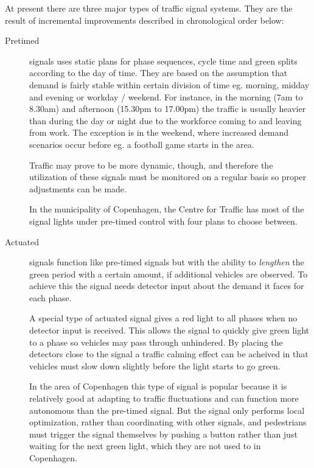 \label{signal_types}

At present there are three major types of traffic signal systems. They are the result of incremental improvements described in chronological order below:

\begin{description}
\item[Pretimed] signals uses static plans for phase sequences, cycle time and green splits according to the day of time. 
\label{pretimed}
They are based on the assumption that demand is fairly stable within certain division of time eg. morning, midday and evening or workday / weekend. For instance, in the morning (7am to 8.30am) and afternoon (15.30pm to 17.00pm) the traffic is usually heavier than during the day or night due to the workforce coming to and leaving from work. The exception is in the weekend, where increased demand scenarios occur before eg. a football game starts in the area.

Traffic may prove to be more dynamic, though, and therefore the utilization of these signals must be monitored on a regular basis so proper adjustments can be made.

In the municipality of Copenhagen, the Centre for Traffic has most of the signal lights under pre-timed control with four plans to choose between.
\item[Actuated] signals function like pre-timed signals but with the ability to \textit{lengthen} the green period with a certain amount, if additional vehicles are observed. 
\label{actuated}
To achieve this the signal needs detector input about the demand it faces for each phase.

A special type of actuated signal gives a red light to all phases when no detector input is received. This allows the signal to quickly give green light to a phase so vehicles may pass through unhindered. By placing the detectors close to the signal a traffic calming effect can be acheived in that vehicles must slow down slightly before the light starts to go green.

In the area of Copenhagen this type of signal is popular because it is relatively good at adapting to traffic fluctuations and can function more autonomous than the pre-timed signal. But the signal only performs local optimization, rather than coordinating with other signals, and pedestrians must trigger the signal themselves by pushing a button rather than just waiting for the next green light, which they are not used to in Copenhagen.


\end{description}
